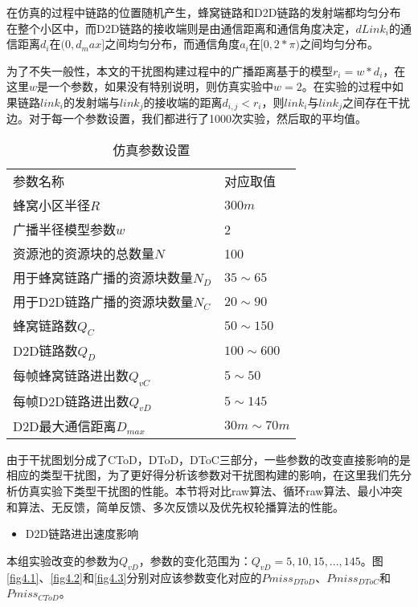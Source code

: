 \documentclass[figurelist,tablelist,algorithmlist,nomlist,masters]{seuthesix}
\begin{document}
	在仿真的过程中链路的位置随机产生，蜂窝链路和D2D链路的发射端都均匀分布在整个小区中，而D2D链路的接收端则是由通信距离和通信角度决定，$dLink_i$的通信距离$d_i$在$(0,d_max]$之间均匀分布，而通信角度$a_i$在$[0,2*\pi )$之间均匀分布。
	
	为了不失一般性，本文的干扰图构建过程中的广播距离基于的模型$r_i = w * d_i$，在这里$w$是一个参数，如果没有特别说明，则仿真实验中$w = 2$。在实验的过程中如果链路$link_i$的发射端与$link_j$的接收端的距离$d_{i,j} <　r_i$，则$link_i$与$link_j$之间存在干扰边。对于每一个参数设置，我们都进行了1000次实验，然后取的平均值。
	
	\begin{table}[!h]
		\caption{\textsc{仿真参数设置}}
		\label{tab:4.1}
		\centering
		\begin{tabular}[t]{p{250pt}p{80pt}}
			\hline\noalign{\smallskip}
			参数名称							&             对应取值		\\
			\noalign{\smallskip}\hline\noalign{\smallskip}
			蜂窝小区半径$R$						&			$300m $         \\
			广播半径模型参数$w$					&			2		        \\
			资源池的资源块的总数量$N$			&			100				\\
			用于蜂窝链路广播的资源块数量$N_D$	&			$35 \sim 65$			\\
			用于D2D链路广播的资源块数量$N_C$	&			$20 \sim 90$			\\
			蜂窝链路数$Q_C$						&			$50 \sim 150$ 		\\
			D2D链路数$Q_D$						&			$100 \sim 600$		\\
			每帧蜂窝链路进出数$Q_{vC}$			&			$5 \sim 50$			\\
			每帧D2D链路进出数$Q_{vD}$			&			$5 \sim 145$			\\
			D2D最大通信距离$D_{max}$			&			$30m \sim 70m$     	\\
			\hline
		\end{tabular}
	\end{table}
	
	由于干扰图划分成了CToD，DToD，DToC三部分，一些参数的改变直接影响的是相应的类型干扰图，为了更好得分析该参数对干扰图构建的影响，在这里我们先分析仿真实验下类型干扰图的性能。本节将对比raw算法、循环raw算法、最小冲突和算法、无反馈，简单反馈、多次反馈以及优先权轮播算法的性能。
	
	
	\begin{itemize}
		\item D2D链路进出速度影响
	\end{itemize}
	
	本组实验改变的参数为$Q_{vD}$，参数的变化范围为：$Q_{vD} = 5,10,15,...,145$。图\ref{fig4.1}、\ref{fig4.2}和\ref{fig4.3}分别对应该参数变化对应的$Pmiss_{DToD}$、$Pmiss_{DToC}$和$Pmiss_{CToD}$。
\end{document}

